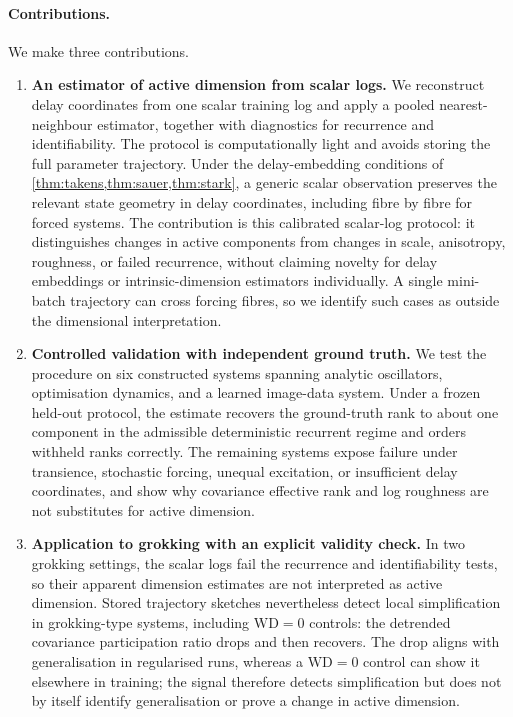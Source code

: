 \documentclass[twoside]{article}
\newenvironment{claude}{\color{claudecolor}}{}
\begin{document}
\begin{claude}
\paragraph{Contributions.} We make three contributions.
\begin{enumerate}[leftmargin=1.2em, itemsep=2pt, topsep=3pt, parsep=0pt]
\item \textbf{An estimator of active dimension from scalar logs.} We reconstruct delay coordinates
from one scalar training log and apply a pooled nearest-neighbour estimator, together with diagnostics
for recurrence and identifiability. The protocol is computationally light and avoids storing the
full parameter trajectory. Under the delay-embedding conditions of
\cref{thm:takens,thm:sauer,thm:stark}, a generic scalar observation preserves the relevant state
geometry in delay coordinates, including fibre by fibre for forced systems. The contribution is this
calibrated scalar-log protocol: it distinguishes changes in active components from changes in scale,
anisotropy, roughness, or failed recurrence, without claiming novelty for delay embeddings or
intrinsic-dimension estimators individually. A single mini-batch trajectory can cross forcing fibres,
so we identify such cases as outside the dimensional interpretation.

\item \textbf{Controlled validation with independent ground truth.} We test the procedure on six
constructed systems spanning analytic oscillators, optimisation dynamics, and a learned image-data
system. Under a frozen held-out protocol, the estimate recovers the ground-truth rank to about one
component in the admissible deterministic recurrent regime and orders withheld ranks correctly. The
remaining systems expose failure under transience, stochastic forcing, unequal excitation, or
insufficient delay coordinates, and show why covariance effective rank and log roughness are not
substitutes for active dimension.

\item \textbf{Application to grokking with an explicit validity check.} In two grokking settings,
the scalar logs fail the recurrence and identifiability tests, so their apparent dimension estimates
are not interpreted as active dimension. Stored trajectory sketches nevertheless detect local
simplification in grokking-type systems, including $\mathrm{WD}=0$ controls: the detrended covariance
participation ratio drops and then recovers. The drop aligns with generalisation in regularised runs,
whereas a $\mathrm{WD}=0$ control can show it elsewhere in training; the signal therefore detects
simplification but does not by itself identify generalisation or prove a change in active dimension.
\end{enumerate}
\end{claude}
\end{document}
